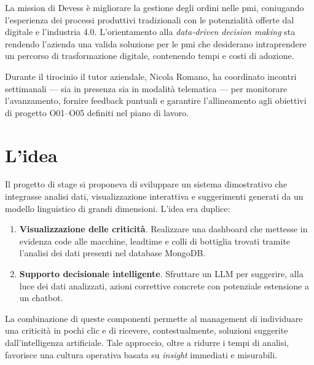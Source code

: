 La mission di Devess è migliorare la gestione degli ordini nelle \gls{pmi}, coniugando l’esperienza dei processi produttivi tradizionali con le potenzialità offerte 
dal digitale e l'industria 4.0. L’orientamento alla \textit{data‑driven decision making} sta rendendo 
l’azienda una valida soluzione per le \gls{pmi} che desiderano intraprendere un percorso di trasformazione digitale, contenendo tempi e costi di adozione.

Durante il tirocinio il tutor aziendale, Nicola Romano, ha coordinato incontri settimanali — sia in presenza sia in modalità telematica — per monitorare l’avanzamento, fornire 
feedback puntuali e garantire l’allineamento agli obiettivi di progetto O01–O05 definiti nel piano di lavoro.

\section{L'idea}
Il progetto di stage si proponeva di sviluppare un sistema dimostrativo che integrasse analisi dati, visualizzazione interattiva e suggerimenti generati da un modello linguistico 
di grandi dimensioni. L’idea era duplice:
\begin{enumerate}
\item \textbf{Visualizzazione delle criticità}. Realizzare una dashboard che mettesse in evidenza code alle macchine, \gls{leadtime} e colli di bottiglia trovati tramite l'analisi dei dati presenti nel database MongoDB.
\item \textbf{Supporto decisionale intelligente}. Sfruttare un \gls{LLM} per suggerire, alla luce dei dati analizzati, azioni correttive concrete con potenziale estensione a un chatbot.
\end{enumerate}

La combinazione di queste componenti permette al management di individuare una criticità in pochi clic e di ricevere, contestualmente, soluzioni suggerite dall’intelligenza artificiale. Tale approccio, oltre a ridurre i tempi di analisi, favorisce una cultura operativa basata su \textit{insight} immediati e misurabili.



